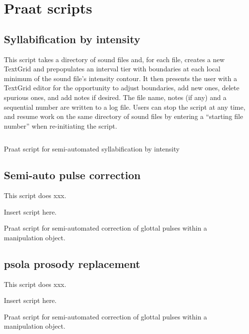 \chapter{Praat scripts\label{apx:PraatScripts}}

\section{Syllabification by intensity}
This script takes a directory of sound files and, for each file, creates a new TextGrid and prepopulates an interval tier with boundaries at each local minimum of the sound file’s intensity contour.  It then presents the user with a TextGrid editor for the opportunity to adjust boundaries, add new ones, delete spurious ones, and add notes if desired.  The file name, notes (if any) and a sequential number are written to a log file.  Users can stop the script at any time, and resume work on the same directory of sound files by entering a “starting file number” when re-initiating the script.

\begin{code}
	\inputminted[fontsize=\small, tabsize=2]{r}{../scripts/syllByIntens_dissVersion.praat}
	\caption[Syllabification by intensity]{Praat script for semi-automated syllabification by intensity\label{lst:SylInt}}
\end{code}

\section{Semi-auto pulse correction}
This script does xxx.

\begin{code}
	Insert script here.
	\caption[Semi-auto pulse correction]{Praat script for semi-automated correction of glottal pulses within a manipulation object.\label{lst:PulseCor}}
\end{code}

\section{\ac{psola} prosody replacement}
This script does xxx.

\begin{code}
	Insert script here.
	\caption[Semi-auto pulse correction]{Praat script for semi-automated correction of glottal pulses within a manipulation object.\label{lst:ProsPSOLA}}
\end{code}
